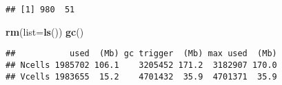 \documentclass[11pt,]{article}
\newenvironment{Shaded}{\begin{snugshade}}{\end{snugshade}}
\newcommand{\KeywordTok}[1]{\textcolor[rgb]{0.13,0.29,0.53}{\textbf{#1}}}
\newcommand{\DataTypeTok}[1]{\textcolor[rgb]{0.13,0.29,0.53}{#1}}
\newcommand{\NormalTok}[1]{#1}
\begin{document}
\begin{verbatim}
## [1] 980  51
\end{verbatim}

\begin{Shaded}
\begin{Highlighting}[]
\KeywordTok{rm}\NormalTok{(}\DataTypeTok{list=}\KeywordTok{ls}\NormalTok{())}
\KeywordTok{gc}\NormalTok{()}
\end{Highlighting}
\end{Shaded}

\begin{verbatim}
##           used  (Mb) gc trigger  (Mb) max used  (Mb)
## Ncells 1985702 106.1    3205452 171.2  3182907 170.0
## Vcells 1983655  15.2    4701432  35.9  4701371  35.9
\end{verbatim}




\newpage
\singlespacing 
\end{document}

